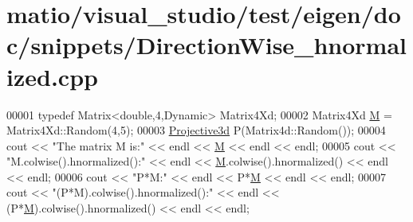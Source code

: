 \hypertarget{matio_2visual__studio_2test_2eigen_2doc_2snippets_2_direction_wise__hnormalized_8cpp_source}{}\section{matio/visual\+\_\+studio/test/eigen/doc/snippets/\+Direction\+Wise\+\_\+hnormalized.cpp}
\label{matio_2visual__studio_2test_2eigen_2doc_2snippets_2_direction_wise__hnormalized_8cpp_source}

\begin{DoxyCode}
00001 \textcolor{keyword}{typedef} Matrix<double,4,Dynamic> Matrix4Xd;
00002 Matrix4Xd \hyperlink{group___core___module_class_eigen_1_1_matrix}{M} = Matrix4Xd::Random(4,5);
00003 \hyperlink{group___geometry___module_gab9cec8c457da930391eb73370e07aaae}{Projective3d} P(Matrix4d::Random());
00004 cout << \textcolor{stringliteral}{"The matrix M is:"} << endl << \hyperlink{group___core___module_class_eigen_1_1_matrix}{M} << endl << endl;
00005 cout << \textcolor{stringliteral}{"M.colwise().hnormalized():"} << endl << \hyperlink{group___core___module_class_eigen_1_1_matrix}{M}.colwise().hnormalized() << endl << endl;
00006 cout << \textcolor{stringliteral}{"P*M:"} << endl << P*\hyperlink{group___core___module_class_eigen_1_1_matrix}{M} << endl << endl;
00007 cout << \textcolor{stringliteral}{"(P*M).colwise().hnormalized():"} << endl << (P*\hyperlink{group___core___module_class_eigen_1_1_matrix}{M}).colwise().hnormalized() << endl << endl;
\end{DoxyCode}
